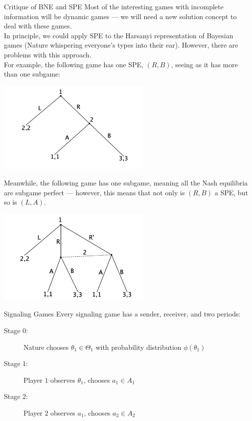 \documentclass[10pt]{extarticle}
\begin{document}
  \begin{problem}{Critique of BNE and SPE}
    Most of the interesting games with incomplete information will be dynamic games --- we will need a new solution concept to deal with these games.\\

    In principle, we could apply SPE to the Harsanyi representation of Bayesian games (Nature whispering everyone's types into their ear). However, there are problems with this approach.\\

    For example, the following game has one SPE, $(R,B)$, seeing as it has more than one subgame:
    \begin{center}
      \includegraphics[width=7.5cm]{images/SPE_1.png}
    \end{center}
    Meanwhile, the following game has one subgame, meaning all the Nash equilibria are subgame perfect --- however, this means that not only is $(R,B)$ a SPE, but so is $(L,A)$.
    \begin{center}
      \includegraphics[width=7.5cm]{images/SPE_2.png}
    \end{center}
  \end{problem}
  \begin{problem}{Signaling Games}
    Every signaling game has a sender, receiver, and two periods:
    \begin{description}
      \item[Stage 0:] Nature chooses $\theta_1\in \Theta_1$ with probability distribution $\phi(\theta_1)$
      \item[Stage 1:] Player $1$ observes $\theta_1$, chooses $a_1\in A_1$
      \item[Stage 2:] Player $2$ observes $a_1$, chooses $a_2\in A_2$
    \end{description}
  \end{problem}
\end{document}
